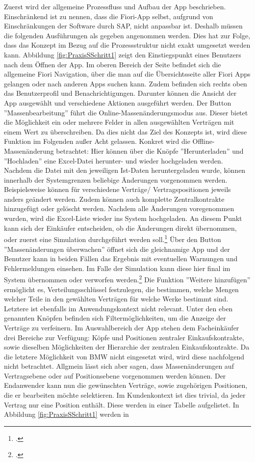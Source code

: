 Zuerst wird der allgemeine Prozessfluss und Aufbau der App beschrieben. Einschränkend ist zu nennen, dass die Fiori-App selbst, aufgrund von Einschränkungen der Software durch SAP, nicht anpassbar ist. Deshalb müssen die folgenden Ausführungen als gegeben angenommen werden. Dies hat zur Folge, dass das Konzept im Bezug auf die Prozessstruktur nicht exakt umgesetzt werden kann. Abbildung \ref{fig:PraxisSSchritt1} zeigt den Einstiegspunkt eines Benutzers nach dem Öffnen der App. Im oberen Bereich der Seite befindet sich die allgemeine Fiori Navigation, über die man auf die Übersichtsseite aller Fiori Apps gelangen oder nach anderen Apps suchen kann. Zudem befinden sich rechts oben das Benutzerprofil und Benachrichtigungen. Darunter können die Ansicht der App ausgewählt und verschiedene Aktionen ausgeführt werden. Der Button ''Massenbearbeitung'' führt die Online-Massenänderungsmodus aus. Dieser bietet die Möglichkeit ein oder mehrere Felder in allen ausgewählten Verträgen mit einem Wert zu überschreiben. Da dies nicht das Ziel des Konzepts ist, wird diese Funktion im Folgenden au\ss er Acht gelassen. Konkret wird die Offline-Massenänderung betrachtet: Hier können über die Knöpfe ''Herunterladen'' und ''Hochladen'' eine Excel-Datei herunter- und wieder hochgeladen werden. Nachdem die Datei mit den jeweiligen Ist-Daten heruntergeladen wurde, können innerhalb der Systemgrenzen beliebige Änderungen vorgenommen werden. Beispielsweise können für verschiedene Verträge/ Vertragspositionen jeweils anders geändert werden. Zudem können auch komplette Zentralkontrakte hinzugefügt oder gelöscht werden. Nachdem alle Änderungen voregenommen wurden, wird die Excel-Liste wieder ins System hochgeladen. An diesem Punkt kann sich der Einkäufer entscheiden, ob die Änderungen direkt übernommen, oder zuerst eine Simulation durchgeführt werden soll.\footcite[Vgl.][]{theorie_sap_fiori_make_mass_changes_2024} Über den Button ''Massenänderungen überwachen'' öffnet sich die gleichnamige App und der Benutzer kann in beiden Fällen das Ergebnis mit eventuellen Warnungen und Fehlermeldungen einsehen. Im Falle der Simulation kann diese hier final im System übernommen oder verworfen werden.\footcite[Vgl.][]{theorie_sap_fiori_monitor_mass_changes_2024} Die Funktion ''Weitere hinzufügen'' ermöglicht es, Verteilungsschlüssel festzulegen, die bestimmen, welche Mengen welcher Teile in den gewählten Verträgen für welche Werke bestimmt sind. Letztere ist ebenfalls im Anwendungskontext nicht relevant. Unter den eben genannten Knöpfen befinden sich Filtermöglichkeiten, um die Anzeige der Verträge zu verfeinern. Im Auswahlbereich der App stehen dem Facheinkäufer drei Bereiche zur Verfügung: Köpfe und Positionen zentraler Einkaufskontrakte, sowie dieselben Möglichkeiten der Hierarchie der zentralen Einkaufskontrakte. Da die letztere Möglichkeit von BMW nicht eingesetzt wird, wird diese nachfolgend nicht betrachtet. Allgmein lässt sich aber sagen, dass Massenänderungen auf Vertragsebene oder auf Positionsebene vorgenommen werden können. Der Endanwender kann nun die gewünschten Verträge, sowie zugehörigen Positionen, die er bearbeiten möchte selektieren. Im Kundenkontext ist dies trivial, da jeder Vertrag nur eine Position enthält. Diese werden in einer Tabelle aufgelistet. In Abbildung \ref{fig:PraxisSSchritt1} werden in 